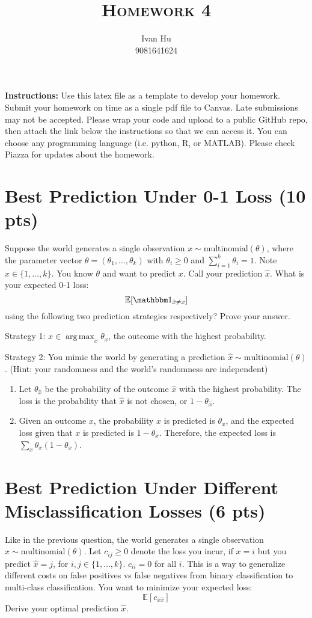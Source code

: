 \documentclass[a4paper]{article}
\title{\textsc{Homework 4}} %
\author{
Ivan Hu\\
9081641624\\
}
\date{}
\theoremstyle{definition}
\DeclareMathOperator*{\argmax}{arg\,max}
\def\E{\mathbb E}
\def\ind{\mathbbm 1}
\newenvironment{soln}{
    \leavevmode\color{blue}\ignorespaces
}{}
\begin{document}
\maketitle 


\textbf{Instructions:} Use this latex file as a template to develop your homework. Submit your homework on time as a single pdf file to Canvas. Late submissions may not be accepted. Please wrap your code and upload to a public GitHub repo, then attach the link below the instructions so that we can access it. You can choose any programming language (i.e. python, R, or MATLAB). Please check Piazza for updates about the homework.

\section{Best Prediction Under 0-1 Loss (10 pts)}
Suppose the world generates a single observation $x \sim \mbox{multinomial}(\theta)$, where the parameter vector $\theta=(\theta_1, \ldots, \theta_k)$ with $\theta_i\ge 0$ and $\sum_{i=1}^k \theta_i=1$.  Note $x \in \{1, \ldots, k\}$.
You know $\theta$ and want to predict $x$. 
Call your prediction $\hat x$.  What is your expected 0-1 loss: 
$$\E[\ind_{\hat x \neq x}]$$
using the following two prediction strategies respectively?  Prove your answer.


Strategy 1: $\hat x \in \argmax_x \theta_x$, the outcome with the highest probability.

Strategy 2: You mimic the world by generating a prediction $\hat x \sim \mbox{multinomial}(\theta)$.  (Hint: your randomness and the world's randomness are independent)

\begin{soln}
  \begin{enumerate}
    \item Let $\theta_{\hat{x}}$ be the probability of the outcome $\hat x$ with the highest probability. The loss is the probability that $\hat x$ is not chosen, or $1-\theta_{\hat x}$.

    \item Given an outcome $x$, the probability $x$ is predicted is $\theta_{x}$, and the expected loss given that $x$ is predicted is $1-\theta_{x}$. Therefore, the expected loss is $\sum_{x}\theta_{x}(1-\theta_{x})$.
  \end{enumerate}
\end{soln}

\section{Best Prediction Under Different Misclassification Losses (6 pts)}
Like in the previous question, 
the world generates a single observation $x \sim \mbox{multinomial}(\theta)$.
Let $c_{ij} \ge 0$ denote the loss you incur, if $x=i$ but you predict $\hat x=j$, for $i,j \in \{1, \ldots, k\}$.
$c_{ii}=0$ for all $i$.
This is a way to generalize different costs on false positives vs false negatives from binary classification to multi-class classification.
You want to minimize your expected loss:
$$\E[c_{x \hat x}]$$
Derive your optimal prediction $\hat x$.
\end{document}
